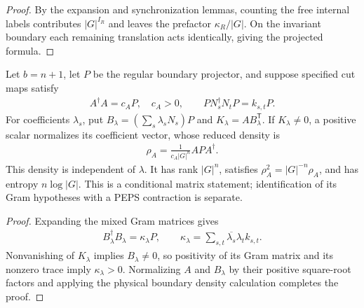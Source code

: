 \begin{proof}\leanok
    By the expansion and synchronization lemmas, counting the free
    internal labels contributes $|G|^{I_R}$ and leaves the prefactor
    $\kappa_R/|G|$. On the invariant boundary each remaining translation
    acts identically, giving the projected formula.
\end{proof}

\begin{lemma}%
    \label{thm:peps_regular_closure_superposition_density}
    \leanok
    Let $b=n+1$, let $P$ be the regular boundary projector, and suppose
    specified cut maps satisfy
    \begin{align}
        A^\dagger A=c_AP,\quad c_A>0,\qquad
        PN_s^\dagger N_tP=k_{s,t}P.
    \end{align}
    For coefficients $\lambda_s$, put
    $B_\lambda=(\sum_s\lambda_sN_s)P$ and
    $K_\lambda=AB_\lambda^{\mathsf T}$. If $K_\lambda\ne0$, a positive
    scalar normalizes its coefficient vector, whose reduced density is
    \begin{align}
        \rho_A=
        \frac{1}{c_A|G|^n}APA^\dagger.
    \end{align}
    This density is independent of $\lambda$. It has rank $|G|^n$,
    satisfies $\rho_A^2=|G|^{-n}\rho_A$, and has entropy $n\log|G|$.
    This is a conditional matrix statement; identification of its Gram
    hypotheses with a PEPS contraction is separate.
\end{lemma}

\begin{proof}\leanok
    Expanding the mixed Gram matrices gives
    \begin{align}
        B_\lambda^\dagger B_\lambda=\kappa_\lambda P,\qquad
        \kappa_\lambda=\sum_{s,t}\overline{\lambda_s}\lambda_t k_{s,t}.
    \end{align}
    Nonvanishing of $K_\lambda$ implies $B_\lambda\ne0$, so positivity of
    its Gram matrix and its nonzero trace imply $\kappa_\lambda>0$.
    Normalizing $A$ and $B_\lambda$ by their positive square-root factors
    and applying the physical boundary density calculation completes the proof.
\end{proof}

